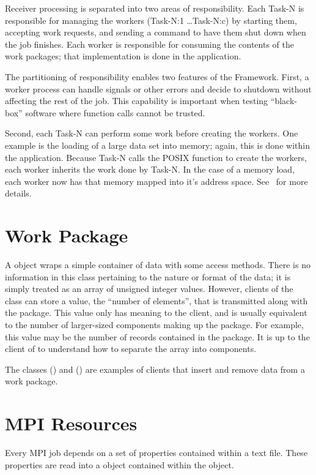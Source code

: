 Receiver processing is separated into two areas
of responsibility. Each Task-N is responsible for managing the workers
(Task-N:1 \ldots Task-N:c) by starting them, accepting work requests, and
sending a command to have them shut down when the job finishes. Each worker
is responsible for consuming the contents of the work packages; that
implementation is done in the application.

The partitioning of responsibility enables two features of the Framework.
First, a worker process can handle signals or other errors and decide to
shutdown without affecting the rest of the job. This capability is important
when testing ``black-box'' software where function calls cannot be trusted.

Second, each Task-N can perform some work before creating the workers. One
example is the loading of a large data set into memory; again, this is done
within the application. Because Task-N calls the POSIX function 
to create the workers, each worker inherits the work done by Task-N. In the
case of a memory load, each worker now has that memory mapped into it's address
space. See~ for more details.

\section{Work Package}
\label{sec-workpackage}

A  object wraps a simple container of data
with some access methods. There is no information in this class pertaining to
the nature or format of the data; it is simply treated as an array of unsigned
integer values. However, clients of the class can store a value, the ``number
of elements'', that is transmitted along with the package. This value only
has meaning to the client, and is usually equivalent to the number of
larger-sized components making up the package. For example, this value may
be the number of records contained in the package. It is up to the client
of  to understand how to separate the array into components.

The classes  ()
and  ()
are examples of  clients that insert and remove data from
a work package.

\section{MPI Resources}
\label{sec-mpiresources}
Every MPI job depends on a set of properties contained within a text file.
These properties are read into a  object contained within
the  object.

